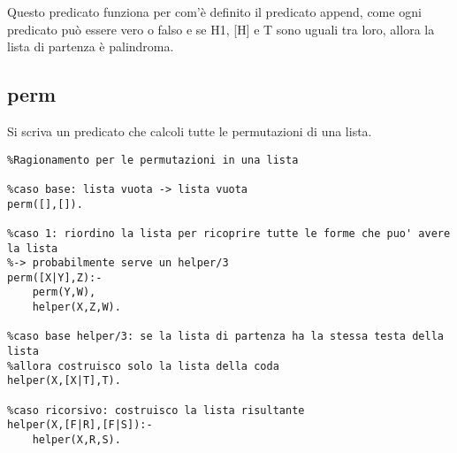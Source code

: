 Questo predicato funziona per com'è definito il predicato append, come ogni predicato può essere vero o falso e se H1, [H] e T sono uguali tra loro, allora la lista di partenza è palindroma.

\subsection{perm}

Si scriva un predicato che calcoli tutte le permutazioni di una lista.

\begin{lstlisting}
%Ragionamento per le permutazioni in una lista

%caso base: lista vuota -> lista vuota
perm([],[]).

%caso 1: riordino la lista per ricoprire tutte le forme che puo' avere la lista
%-> probabilmente serve un helper/3
perm([X|Y],Z):-
    perm(Y,W),
    helper(X,Z,W).

%caso base helper/3: se la lista di partenza ha la stessa testa della lista
%allora costruisco solo la lista della coda
helper(X,[X|T],T). 

%caso ricorsivo: costruisco la lista risultante
helper(X,[F|R],[F|S]):-
    helper(X,R,S).
\end{lstlisting}